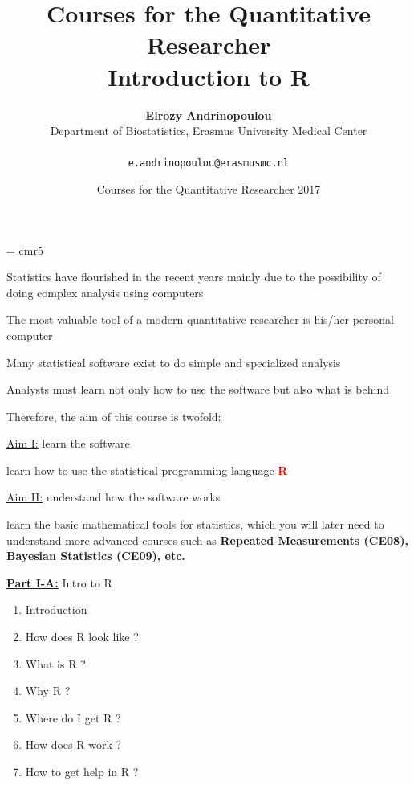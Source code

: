\documentclass{presentatiesmetlogo}
\newcommand{\redbf}[1]{\textcolor{red}{\textbf{#1}}}
\newcommand{\R}{{\textsf{R} }}
\let \nl = \newline
\begin{document}
\pagestyle{myheadings}
\font
\fivrm = cmr5
\relax



\sffamily
\raggedright
\LARGE

\title{Courses for the Quantitative Researcher\\Introduction to R}
\author{{\bfseries Elrozy Andrinopoulou}\\
Department of Biostatistics, Erasmus University Medical Center\\
$\mbox{ }$\\\texttt{e.andrinopoulou@erasmusmc.nl}}
\date{Courses for the Quantitative Researcher 2017}

\maketitle
\bitem
\item Statistics have flourished in the recent years mainly
due to the possibility of doing complex analysis using computers
\nl
\item The most valuable tool of a modern quantitative researcher
is his/her personal computer
\bitemt
\item Many statistical software exist to do simple and specialized
analysis
\nl
\eitem
\item Analysts must learn not only how to use the software
but also what is behind
\eitem
\bitem
\item Therefore, the aim of this course is twofold:
\nl
\item \underline{Aim I:} learn the software
\bitemt
\item learn how to use the statistical programming language \redbf{R}
\nl
\eitemt
\item \underline{Aim II:} understand how the software works
\bitemt
\item learn the basic mathematical tools for statistics, which you
will later need to understand more advanced courses such as
\textbf{Repeated Measurements (CE08), Bayesian Statistics (CE09), etc.}
\nl
\eitemt
\eitem
\bitem
\item {\huge \underline{\textbf{Part I-A:}} Intro to \R}
\begin{enumerate}
\item Introduction
\newline
\newline
\bitemt
\item How does \R look like ?
\item What is \R ?
\item Why \R ?
\item Where do I get \R ?
\item How does \R work ?
\item How to get help in \R ?
\eitemt
\end{enumerate}
\end{document}
